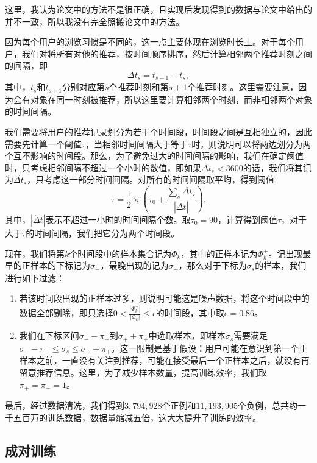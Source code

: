 \documentclass[12pt]{article} %
\begin{document}
\begin{sloppypar}
这里，我认为论文中的方法不是很正确，且实现后发现得到的数据与论文中给出的并不一致，所以我没有完全照搬论文中的方法。

因为每个用户的浏览习惯是不同的，这一点主要体现在浏览时长上。对于每个用户，我们对将所有对他的推荐，按时间顺序排序，然后计算相邻两个推荐时刻之间的间隔，即
\begin{equation}
	\Delta t_s = t_{s+1} - t_s,
\end{equation}
其中，$t_s$和$t_{s+1}$分别对应第$s$个推荐时刻和第$s+1$个推荐时刻。这里需要注意，因为会有对象在同一时刻被推荐，所以这里要计算相邻两个时刻，而非相邻两个对象的时间间隔。

我们需要将用户的推荐记录划分为若干个时间段，时间段之间是互相独立的，因此需要先计算一个阈值$\tau$，当相邻时间间隔大于等于$\tau$时，则说明可以将两边划分为两个互不影响的时间段。那么，为了避免过大的时间间隔的影响，我们在确定阈值时，只考虑相邻间隔不超过一个小时的数值，即如果$\Delta t_s<3600$的话，我们将其记为$\ddot{\Delta t_s}$，只考虑这一部分时间间隔。对所有的时间间隔取平均，得到阈值
\begin{equation}
\tau = \frac{1}{2} \times (\tau_0 + \frac{\sum_{s}\ddot{\Delta t_s}}{|\ddot{\Delta t}|}).
\end{equation}
其中，$|\ddot{\Delta t}|$表示不超过一小时的时间间隔个数。取$\tau_0=90$，计算得到阈值$\tau$，对于大于$\tau$的时间间隔，我们把它分为两个时间段。

现在，我们将第$k$个时间段中的样本集合记为$\Phi_k$，其中的正样本记为$\Phi^+_k$。记出现最早的正样本的下标记为$\sigma_-$，最晚出现的记为$\sigma_+$，那么对于下标为$\sigma_s$的样本，我们进行如下过滤：
\begin{enumerate}
	\item 若该时间段出现的正样本过多，则说明可能这是噪声数据，将这个时间段中的数据全部剔除，即只选择$0< \frac{|\Phi^+_k|}{|\Phi_k|} \le \epsilon$的时间段，其中取$\epsilon=0.86$。
	\item 我们在下标区间$\sigma_--\pi_-$到$\sigma_++\pi_+$中选取样本，即样本$\sigma_s$需要满足$\sigma_--\pi_-\le\sigma_s\le\sigma_++\pi_+$。这一限制是基于假设：用户可能在意识到第一个正样本之前，一直没有关注到推荐，可能在接受最后一个正样本之后，就没有再留意推荐信息。这里，为了减少样本数量，提高训练效率，我们取$\pi_+=\pi_-=1$。
\end{enumerate}

最后，经过数据清洗，我们得到$3,794,928$个正例和$11,193,905$个负例，总共约一千五百万的训练数据，数据量缩减五倍，这大大提升了训练的效率。

\subsection{成对训练}


\end{sloppypar}
\end{document}

